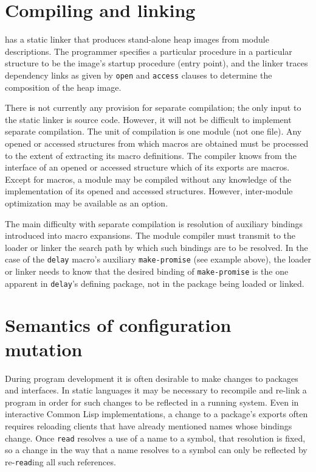 \section{Compiling and linking}

\hack{} has a static linker that produces stand-alone heap images
from module descriptions.  The programmer specifies a particular procedure in a
particular structure to be the image's startup procedure (entry
point), and the linker traces dependency links as given by {\tt open}
and {\tt access} clauses to determine the composition of the heap
image.

There is not currently any provision for separate compilation; the
only input to the static linker is source code.  However, it will not
be difficult to implement separate compilation.  The unit of
compilation is one module (not one file).  Any opened or accessed
structures from which macros are obtained must be processed to the
extent of extracting its macro definitions.  The compiler knows from
the interface of an opened or accessed structure which of its exports
are macros.  Except for macros, a module may be compiled without any
knowledge of the implementation of its opened and accessed structures.
However, inter-module optimization may be available as an option.

The main difficulty with separate compilation is resolution of
auxiliary bindings introduced into macro expansions.  The module
compiler must transmit to the loader or linker the search path by
which such bindings are to be resolved.  In the case of the {\tt delay}
macro's auxiliary {\tt make-promise} (see example above), the loader
or linker needs to know that the desired binding of {\tt make-promise}
is the one apparent in {\tt delay}'s defining package, not in the
package being loaded or linked.


\section{Semantics of configuration mutation}

During program development it is often desirable to make changes to
packages and interfaces.  In static languages it may be necessary to
recompile and re-link a program in order for such changes to be
reflected in a running system.  Even in interactive Common Lisp
implementations, a change to a package's exports often requires
reloading clients that have already mentioned names whose bindings
change.  Once {\tt read} resolves a use of a name to a symbol, that
resolution is fixed, so a change in the way that a name resolves to a
symbol can only be reflected by re-{\tt read}ing all such references.


